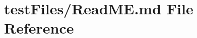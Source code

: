\hypertarget{test_files_2_r_e_a_d_m_e_8md}{}\section{test\+Files/\+Read\+ME.md File Reference}
\label{test_files_2_r_e_a_d_m_e_8md}
